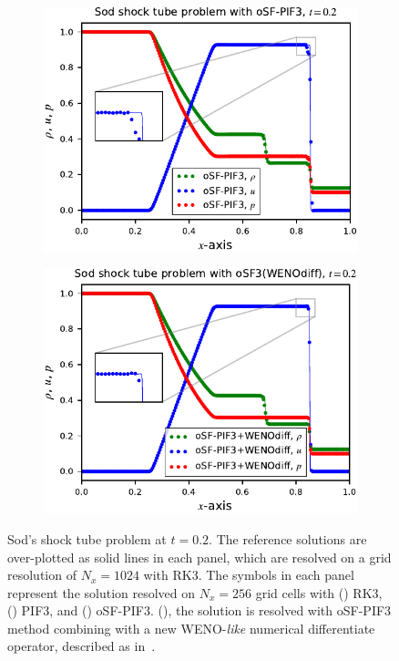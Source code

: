 \begin{figure}
\begin{subfigure}{0.495\textwidth}
        \includegraphics[width=\textwidth]{fig/sod_osf3}
        \caption{}\label{subfig:sod_osf3}
    \end{subfigure}
    \begin{subfigure}{0.495\textwidth}
        \centering
        \includegraphics[width=\textwidth]{fig/sod_osf3_wenodiff}
        \caption{}\label{subfig:sod_osf3_wenodiff}
    \end{subfigure}
    \caption{Sod's shock tube problem at \( t = 0.2 \).
        The reference solutions are over-plotted
        as solid lines in each panel, which are resolved on a grid resolution of \( N_{x} = 1024 \)
        with RK3. The symbols in each panel represent the solution resolved on
        \( N_{x} = 256 \) grid cells with
        (\protect{}) RK3,
        (\protect{}) PIF3, and (\protect{}) oSF-PIF3\@.
        (\protect{}), the solution is resolved
        with oSF-PIF3 method combining with a new WENO-\textit{like} numerical differentiate operator,
        described as in~.
    }\label{fig:sod_third}
\end{figure}


